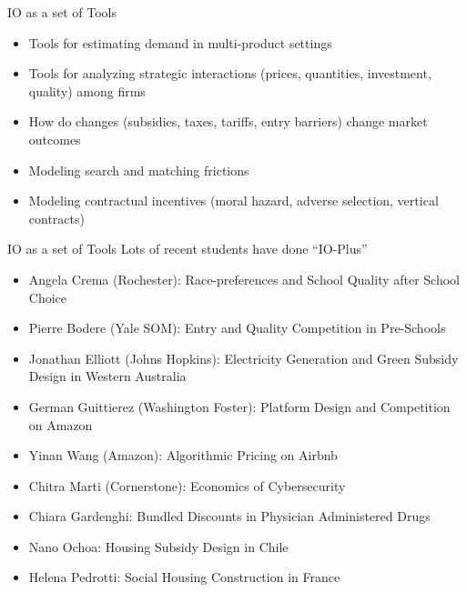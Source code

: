 \begin{frame}{IO as a set of Tools}
\begin{itemize}
    \item Tools for estimating demand in multi-product settings
    \item Tools for analyzing strategic interactions (prices, quantities, investment, quality) among firms
    \item How do changes (subsidies, taxes, tariffs, entry barriers) change market outcomes
    \item Modeling search and matching frictions
    \item Modeling contractual incentives (moral hazard, adverse selection, vertical contracts)
\end{itemize}
\end{frame}



\begin{frame}{IO as a set of Tools}
Lots of recent students have done ``IO-Plus''
\begin{itemize}
    \item Angela Crema (Rochester): Race-preferences and School Quality after School Choice
    \item Pierre Bodere (Yale SOM): Entry and Quality Competition in Pre-Schools
    \item Jonathan Elliott (Johns Hopkins): Electricity Generation and Green Subsidy Design in Western Australia
    \item German Guittierez (Washington Foster): Platform Design and Competition on Amazon
    \item Yinan Wang (Amazon): Algorithmic Pricing on Airbnb
    \item Chitra Marti (Cornerstone): Economics of Cybersecurity
    \item Chiara Gardenghi: Bundled Discounts in Physician Administered Drugs
    \item Nano Ochoa: Housing Subsidy Design in Chile
    \item Helena Pedrotti: Social Housing Construction in France
\end{itemize}
\end{frame}



